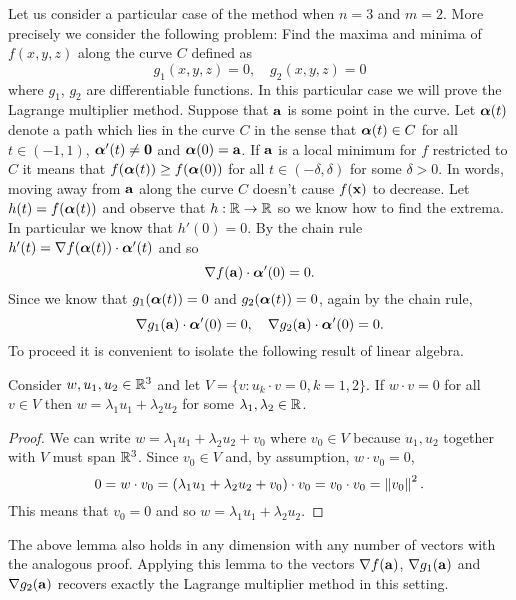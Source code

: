 Let us consider a particular case of the method when \(n=3\) and \(m=2\).
More precisely we consider the following problem:
Find the maxima and minima of \(f(x,y,z)\) along the curve \(C\) defined as
\[
    g_1(x,y,z) = 0,
    \quad
    g_2(x,y,z) = 0
\]
where \(g_1\), \(g_2\) are differentiable functions.
In this particular case we will prove the Lagrange multiplier method.
Suppose that \(\aa\) is some point in the curve.
Let \(\aalpha(t)\) denote a path which lies in the curve \(C\) in the sense that \(\aalpha(t) \in C\) for all \(t\in (-1,1)\), \(\aalpha'(t)\neq \mathbf{0}\) and \(\aalpha(0)=\aa\).
If \(\aa\) is a local minimum for \(f\) restricted to \(C\) it means that \(f(\aalpha(t))\geq f(\aalpha(0))\) for all \(t \in (-\delta,\delta)\) for some \(\delta>0\).
In words, moving away from \(\aa\) along the curve \(C\) doesn't cause \(f(\xx)\) to decrease.
Let \(h(t) = f(\aalpha(t))\) and observe that \(h:\bR \to \bR\) so we know how to find the extrema.
In particular we know that \(h'(0)=0\).
By the chain rule \(h'(t) = \nabla f(\aalpha(t))\cdot \aalpha'(t)\) and so
\[
    \nabla f(\aa)\cdot \aalpha'(0) = 0.
\]
Since we know that \(g_1(\aalpha(t))=0\) and \(g_2(\aalpha(t))=0\), again by the chain rule,
\[
    \nabla g_1(\aa)\cdot \aalpha'(0) = 0,
    \quad
    \nabla g_2(\aa)\cdot \aalpha'(0) = 0.
\]
To proceed it is convenient to isolate the following result of linear algebra.
\begin{lemma*}
    Consider \(w, u_1,u_2 \in \bR^3\) and let \(V = \{v : u_k \cdot v = 0, k =1,2\}\).
    If \(w\cdot v =0\) for all \(v \in V\) then \(w = \lambda_1 u_1 + \lambda_2 u_2\) for some \(\lambda_1,\lambda_2 \in \bR\).
\end{lemma*}
\begin{proof}
    We can write \(w = \lambda_1 u_1 + \lambda_2 u_2 + v_0\) where \(v_0 \in V\) because \(u_1, u_2\) together with \(V\) must span \(\bR^3\).
    Since \(v_0 \in V\) and, by assumption, \(w\cdot v_0 = 0\),
    \[
        0 = w\cdot v_0
        = (\lambda_1 u_1 + \lambda_2 u_2 + v_0)\cdot v_0
        = v_0\cdot v_0
        = \norm{v_0}^2.
    \]
    This means that \(v_0 =0\) and so \(w = \lambda_1 u_1 + \lambda_2 u_2\).
\end{proof}

The above lemma also holds in any dimension with any number of vectors with the analogous proof.
Applying this lemma to the vectors \(\nabla f(\aa)\), \(\nabla g_1(\aa)\) and \(\nabla g_2(\aa)\) recovers exactly the Lagrange multiplier method in this setting.



\bookletend

